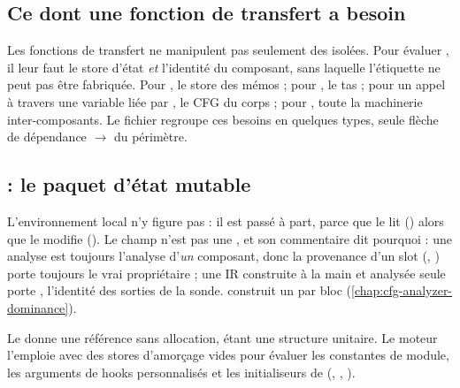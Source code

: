 \subsection{Ce dont une fonction de transfert a besoin}

Les fonctions de transfert ne manipulent pas seulement des
 isolées. Pour évaluer , il leur faut le
store d'état \emph{et} l'identité du composant, sans laquelle l'étiquette
 ne peut pas être fabriquée. Pour ,
le store des mémos ; pour , le tas ; pour un appel à travers
une variable liée par , le CFG du corps ; pour
, toute la machinerie inter-composants. Le fichier
 regroupe ces besoins en quelques types, seule
flèche de dépendance  $\to$  du périmètre.

\subsection{ : le paquet d'état mutable}


L'environnement local n'y figure pas : il est passé à part, parce que
 le lit (\code{&}) alors que  le modifie
(). Le champ  n'est pas une , et son
commentaire dit pourquoi : une analyse est toujours l'analyse d'\emph{un}
composant, donc la provenance d'un slot (, )
porte toujours le vrai propriétaire ; une IR construite à la main et
analysée seule porte , l'identité
 des sorties de la sonde.  construit un
 par bloc (\cref{chap:cfg-analyzer-dominance}).


Le  donne une référence 
sans allocation,  étant une structure unitaire. Le moteur
l'emploie avec des stores d'amorçage vides pour évaluer les constantes
de module, les arguments de hooks personnalisés et les initialiseurs de
 (,
, ).

